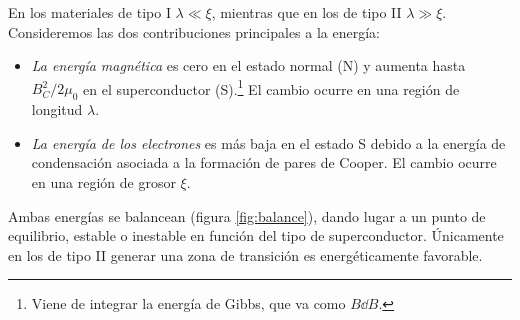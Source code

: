 \documentclass{tufte-book}
\newcommand{\sub}[1]{_{{\scriptscriptstyle\mathit{#1}}}}
\begin{document}
En los materiales de tipo I $λ≪ξ$, mientras que en los de tipo II
$λ≫ξ$. Consideremos las dos contribuciones principales a la energía:
\begin{itemize}
\item \textit{La energía magnética} es cero en el estado normal (N) y
  aumenta hasta $B\sub{C}^2/2μ_0$ en el superconductor
  (S).\footnote{Viene de integrar la energía de Gibbs, que va como $B \dd{B}$.}
  El cambio ocurre en una región de
  longitud $λ$.
\item \textit{La energía de los electrones} es más baja en el estado S
  debido a la energía de condensación asociada a la formación de pares
  de Cooper. El cambio ocurre en una región de grosor $ξ$.
\end{itemize}

Ambas energías se balancean (figura \ref{fig:balance}), dando lugar a
un punto de equilibrio, estable o inestable en función del tipo de
superconductor. Únicamente en los de tipo II generar una zona de
transición es energéticamente favorable.
\end{document}
